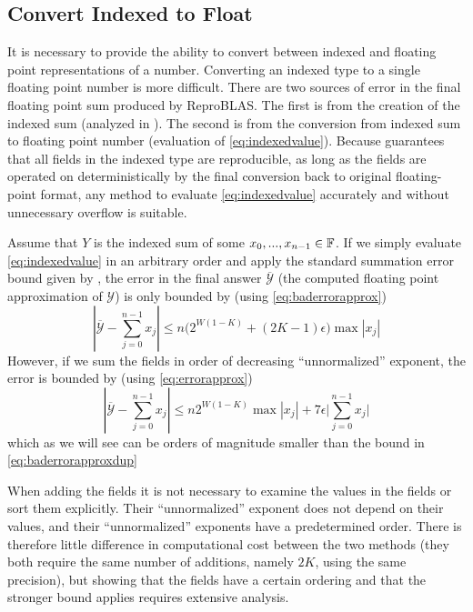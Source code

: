\subsection{Convert Indexed to Float}
    \label{sec:primitiveops_convert}
    It is necessary to provide the ability to convert between indexed and
    floating point representations of a number.
    Converting an indexed type to a single floating point number is more
    difficult. There are two sources of error in the final floating point sum
    produced by ReproBLAS. The first is from the creation of the indexed sum
    (analyzed in \cite{repsum}). The second is from the conversion from indexed
    sum to floating point number (evaluation of  \eqref{eq:indexedvalue}).
    Because \cite{repsum} guarantees that all fields in the indexed type are
    reproducible, as long as the fields are operated on deterministically
    by the final conversion back to original floating-point format,
    any method to evaluate  \eqref{eq:indexedvalue} accurately and without
    unnecessary overflow is suitable.

    Assume that $Y$ is the indexed sum of some $x_0, ..., x_{n - 1} \in \mathbb{F}$. If
    we simply evaluate \eqref{eq:indexedvalue} in an arbitrary order and apply
    the standard summation error bound given by \cite{higham}, the error in the
    final answer $\overline{\mathcal{Y}}$ (the computed floating point
    approximation of $\mathcal{Y}$) is only bounded by (using
    \eqref{eq:baderrorapprox})
    \begin{equation}
      |\overline{\mathcal{Y}} - \sum_{j=0}^{n-1}x_j| \leq n \bigl(2^{W  (1 - K)} + (2  K - 1)  \epsilon\bigr)\max|x_j|
      \label{eq:baderrorapproxdup}
    \end{equation}
    However, if we sum the fields in order of decreasing ``unnormalized''
    exponent, the error is bounded by (using  \eqref{eq:errorapprox})
    \begin{equation}
      |\overline{\mathcal{Y}} - \sum_{j=0}^{n-1}x_j| \leq n 2^{W  (1 - K)}\max|x_j|  + 7 \epsilon \bigl|\sum\limits_{j = 0}^{n - 1} x_j\bigr|
      \label{eq:errorapproxdup}
    \end{equation}
    which as we will see can be orders of magnitude smaller than the bound in \eqref{eq:baderrorapproxdup}

    When adding the fields it is not necessary to examine the values in the
    fields or sort them explicitly. Their ``unnormalized'' exponent does not
    depend on their values, and their ``unnormalized'' exponents have a
    predetermined order. There is therefore little difference in computational
    cost between the two methods (they both require the same number of
    additions, namely $2  K$, using the same precision), but showing that the
    fields have a certain ordering and that the stronger bound applies requires
    extensive analysis.

